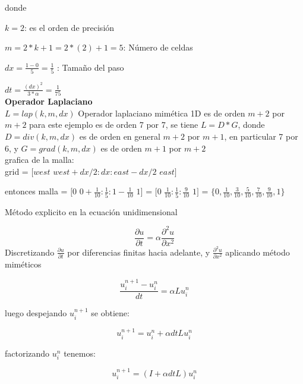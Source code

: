 \documentclass[a4paper,abstract=true]{scrreprt}
\begin{document}
donde 

$k = 2$: es el orden de precisión

 $m = 2*k+1=2*(2)+1 = 5$: Número de celdas
 
$dx =\frac{1-0}{5} =\frac{1}{5}$ : Tamaño del paso 

$dt = \frac{(dx)^{2}}{3*\alpha} =\frac{1}{75}$\\

\textbf{\textbf{Operador Laplaciano}}\\

$L = lap(k,m,dx)$  Operador laplaciano mimética 1D es de orden $m+2$ por $m+2$ para este ejemplo es de orden  7 por 7,  se tiene $L = D* G$, donde $D = div(k,m,dx)$ es de orden en general $m+2$ por $m+1$, en particular 7 por 6, y $G = grad(k,m,dx)$ es de orden $m+1$ por $m+2$\\


grafica de la malla:\\


 grid = $[west$  $west+dx/2: dx :east-dx/2$  $east]$
 
entonces malla = $[0$ $0+\frac{1}{10}: \frac{1}{5}: 1-\frac{1}{10}$ $1  ]$ = $[0$ $\frac{1}{10}: \frac{1}{5}: \frac{9}{10}$ $1]$ = $  \{0, \frac{1}{10}, \frac{3}{10}, \frac{5}{10}, \frac{7}{10}, \frac{9}{10}, 1 \}$


Método explicito en la ecuación unidimensional

\begin{equation}
	\frac{\partial u}{\partial t} = \alpha \frac{\partial^{2} u}{\partial x^{2}}
\end{equation}
Discretizando  $\frac{\partial u}{\partial t}$ por diferencias finitas hacia adelante, y $\frac{\partial^{2} u}{\partial x^{2}}$ aplicando método miméticos

\begin{equation}	
	\frac{u^{n+1}_{i} - u^{n}_{i} }{dt} = \alpha L 	u^{n}_{i}
\end{equation}

 luego despejando $u^{n+1}_{i}$ se obtiene:
 
 \begin{equation}	
 	u^{n+1}_{i} = u^{n}_{i}  +  \alpha dt L u^{n}_{i}
 \end{equation}

factorizando $u^{n}_{i}$ tenemos:

 \begin{equation}	
	u^{n+1}_{i} = (I  +  \alpha dt L )u^{n}_{i}
\end{equation}
\end{document}
